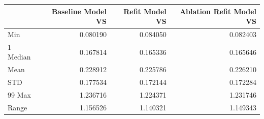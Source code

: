 \begin{tabular}{lrrr}
\toprule
 & Baseline Model VS & Refit Model VS & Ablation Refit Model VS \\
\midrule
Min & 0.080190 & 0.084050 & 0.082403 \\
1%
Median & 0.167814 & 0.165336 & 0.165646 \\
Mean & 0.228912 & 0.225786 & 0.226210 \\
STD & 0.177534 & 0.172144 & 0.172284 \\
99%
Max & 1.236716 & 1.224371 & 1.231746 \\
Range & 1.156526 & 1.140321 & 1.149343 \\
\bottomrule
\end{tabular}
